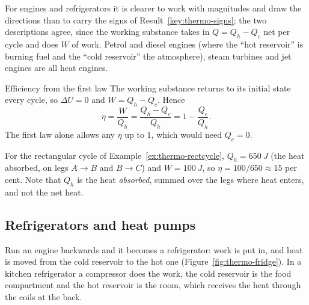 For engines and refrigerators it is clearer to work with magnitudes and draw the directions than to carry
the signs of Result~\ref{key:thermo-signs}; the two descriptions agree, since the working substance takes in
$Q=Q_h-Q_c$ net per cycle and does $W$ of work. Petrol and diesel engines (where the ``hot reservoir'' is
burning fuel and the ``cold reservoir'' the atmosphere), steam turbines and jet engines are all heat
engines.

\begin{figure}[htbp]
\centering
{}
\end{figure}

\begin{keybox}{Efficiency from the first law}\label{key:efficiency}
The working substance returns to its initial state every cycle, so $\Delta U=0$ and $W=Q_h-Q_c$. Hence
\[
\eta=\frac{W}{Q_h}=\frac{Q_h-Q_c}{Q_h}=1-\frac{Q_c}{Q_h}.
\]
The first law alone allows any $\eta$ up to $1$, which would need $Q_c=0$.
\end{keybox}

For the rectangular cycle of Example~\ref{ex:thermo-rectcycle}, $Q_h=\SI{650}{J}$ (the heat absorbed, on
legs $A\to B$ and $B\to C$) and $W=\SI{100}{J}$, so $\eta=100/650\approx15$ per cent. Note that $Q_h$ is the
heat \emph{absorbed}, summed over the legs where heat enters, and not the net heat.

\subsection{Refrigerators and heat pumps}\label{sec:refrigerator}

Run an engine backwards and it becomes a refrigerator: work is put in, and heat is moved from the cold
reservoir to the hot one (Figure~\ref{fig:thermo-fridge}). In a kitchen refrigerator a compressor does
the work, the cold reservoir is the food compartment and the hot reservoir is the room, which receives the
heat through the coils at the back.

\begin{figure}[htbp]
\centering
{}
\end{figure}

